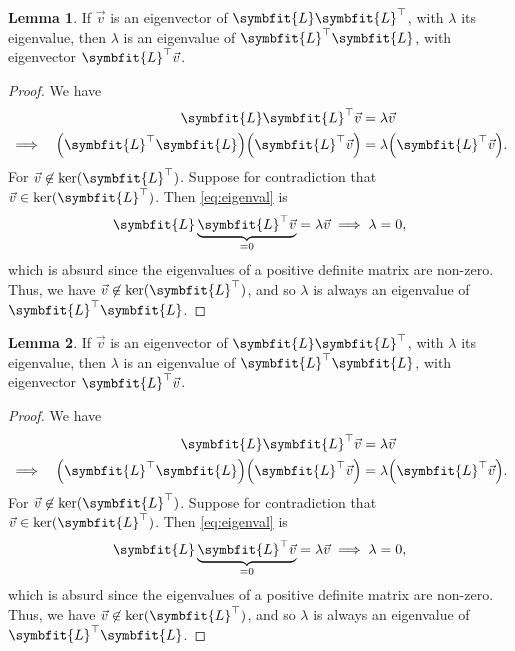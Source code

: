 \documentclass{article}
\theoremstyle{definition}
\newcommand{\mat}[1]{\symbfit{#1}}
\newtheorem{lemma}{Lemma}
\begin{document}
\begin{enumerate}[leftmargin=\labelsep]
	      \begin{lemma}\label{lem:eigenvalsLLT}
		      If \(\vec{v}\) is an eigenvector of \(\mat{L}\mat{L}^\top\), with \(\lambda\) its eigenvalue, then \(\lambda\) is an eigenvalue of \(\mat{L}^\top\mat{L}\), with eigenvector \(\mat{L}^\top \vec{v}\).
	      \end{lemma}
	      \begin{proof}
		      We have
		      \begin{alignat}{4}
			               &  & \mat{L}\mat{L}^\top \vec{v}                          & = \lambda \vec{v} \label{eq:eigenval}         \\
			      \implies &  & \qty(\mat{L}^\top\mat{L}) \qty(\mat{L}^\top \vec{v}) & = \lambda \qty(\mat{L}^\top\vec{v}).\nonumber
		      \end{alignat}
		      For \(\vec{v}\not\in\ker(\mat{L}^\top)\). Suppose for contradiction that \(\vec{v}\in\ker(\mat{L}^\top)\). Then \cref{eq:eigenval} is
		      \[
			      \mat{L}\underbrace{\mat{L}^\top \vec{v}}_{=0} = \lambda \vec{v} \implies \lambda = 0,
		      \]
		      which is absurd since the eigenvalues of a positive definite matrix are non-zero. Thus, we have \(\vec{v}\not\in\ker(\mat{L}^\top)\), and so \(\lambda\) is always an eigenvalue of \(\mat{L}^\top\mat{L}\).
	      \end{proof}
	      \begin{lemma}\label{lem:eigenvalsLLT}
		      If \(\vec{v}\) is an eigenvector of \(\mat{L}\mat{L}^\top\), with \(\lambda\) its eigenvalue, then \(\lambda\) is an eigenvalue of \(\mat{L}^\top\mat{L}\), with eigenvector \(\mat{L}^\top \vec{v}\).
	      \end{lemma}
	      \begin{proof}
		      We have
		      \begin{alignat}{4}
			               &  & \mat{L}\mat{L}^\top \vec{v}                          & = \lambda \vec{v} \label{eq:eigenval}         \\
			      \implies &  & \qty(\mat{L}^\top\mat{L}) \qty(\mat{L}^\top \vec{v}) & = \lambda \qty(\mat{L}^\top\vec{v}).\nonumber
		      \end{alignat}
		      For \(\vec{v}\not\in\ker(\mat{L}^\top)\). Suppose for contradiction that \(\vec{v}\in\ker(\mat{L}^\top)\). Then \cref{eq:eigenval} is
		      \[
			      \mat{L}\underbrace{\mat{L}^\top \vec{v}}_{=0} = \lambda \vec{v} \implies \lambda = 0,
		      \]
		      which is absurd since the eigenvalues of a positive definite matrix are non-zero. Thus, we have \(\vec{v}\not\in\ker(\mat{L}^\top)\), and so \(\lambda\) is always an eigenvalue of \(\mat{L}^\top\mat{L}\).
	      \end{proof}


\end{enumerate}
\end{document}
